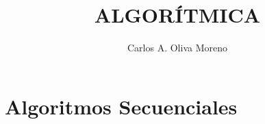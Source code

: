 \documentclass[letterpaper,spanish]{book}
\theoremstyle{definition}
\theoremstyle{plain}
\theoremstyle{plain}
\theoremstyle{remark}
\theoremstyle{plain}
\theoremstyle{plain}
\theoremstyle{definition}
\begin{document}
    \title{ALGORÍTMICA}
    \author{Carlos A. Oliva Moreno}
    \maketitle
    
    \tableofcontents{}
    
    \part{Algoritmos Secuenciales}
        
        
        
        
        
    
    \appendix
        
        
    
    \printbibliography[heading=bibintoc]
\end{document}
